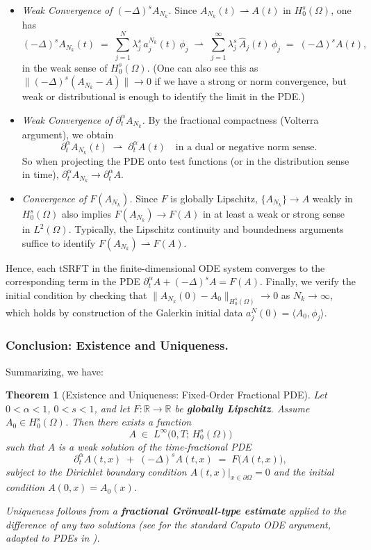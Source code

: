 \documentclass[12pt]{article}
\newtheorem{theorem}{Theorem}[section]
\begin{document}
\begin{itemize}
\item \emph{Weak Convergence of \((- \Delta)^s A_{N_k}\).}
  Since \(A_{N_k}(t)\rightharpoonup A(t)\) in \(H_0^s(\Omega)\), one has
  \[
  (-\Delta)^s A_{N_k}(t)
  \;=\;
  \sum_{j=1}^N \lambda_j^s\,a_j^{N_k}(t)\,\phi_j
  \;\rightharpoonup\;
  \sum_{j=1}^\infty \lambda_j^s \,\hat{A}_j(t)\,\phi_j
  \;=\;
  (-\Delta)^s A(t),
  \]
  in the weak sense of \(H_0^s(\Omega)\).  (One can also see this as
  \(\|(-\Delta)^s(A_{N_k}-A)\|\to 0\) if we have a strong or norm convergence, but
  weak or distributional is enough to identify the limit in the PDE.)
\item \emph{Weak Convergence of \(\partial_t^\alpha A_{N_k}\).}
  By the fractional compactness (Volterra argument), we obtain
  \[
  \partial_t^\alpha A_{N_k}(t)
  \;\rightharpoonup\;
  \partial_t^\alpha A(t)
  \quad
  \text{in a dual or negative norm sense.}
  \]
  So when projecting the PDE onto test functions (or in the distribution sense in time),
  \(\partial_t^\alpha A_{N_k}\to \partial_t^\alpha A\).
\item \emph{Convergence of \(F(A_{N_k})\).}
  Since \(F\) is globally Lipschitz, \(\{A_{N_k}\}\to A\) weakly in \(H_0^s(\Omega)\)
  also implies \(F(A_{N_k})\to F(A)\) in at least a weak or strong sense in \(L^2(\Omega)\).
  Typically, the Lipschitz continuity and boundedness arguments suffice to identify
  \(F(A_{N_k})\rightharpoonup F(A)\).  
\end{itemize}

Hence, each tSRFT in the finite-dimensional ODE system converges to the corresponding term
in the PDE \(\partial_t^\alpha A + (-\Delta)^s A = F(A)\).  Finally, we verify the initial
condition by checking that \(\|A_{N_k}(0)-A_0\|_{H_0^s(\Omega)}\to0\) as \(N_k\to\infty\),
which holds by construction of the Galerkin initial data \(a_j^N(0)=\langle A_0,\phi_j\rangle\).

\subsubsection{Conclusion: Existence and Uniqueness.}
Summarizing, we have:

\begin{theorem}[Existence and Uniqueness: Fixed‐Order Fractional PDE]
\label{thm:FixedOrderExist_expanded}
Let \(0<\alpha<1\), \(0<s<1\), and let \(F:\mathbb{R}\to \mathbb{R}\) be \textbf{globally Lipschitz}.
Assume \(A_0\in H_0^s(\Omega)\). Then there exists a function
\[
A \;\in\; L^\infty\bigl(0,T;\,H_0^s(\Omega)\bigr)
\]
such that \(A\) is a \emph{weak solution} of the time‐fractional PDE
\[
\partial_t^\alpha A(t,x) 
\;+\; 
(-\Delta)^s A(t,x)
\;=\;
F\bigl(A(t,x)\bigr),
\]
subject to the Dirichlet boundary condition \(A(t,x)\big|_{x\in \partial\Omega}=0\) 
and the initial condition \(A(0,x) = A_0(x)\). 

Uniqueness follows from a \textbf{fractional Grönwall‐type estimate} applied
to the difference of any two solutions (see \cite[Ch.~7]{Diethelm2010}
for the standard Caputo ODE argument, adapted to PDEs in \cite{Zacher2005,Ye2007}).
\end{theorem}
\end{document}
